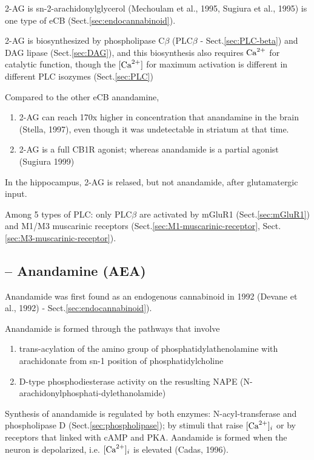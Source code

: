 2-AG is sn-2-arachidonylglycerol (Mechoulam et al., 1995,
Sugiura et al., 1995) is one type of eCB (Sect.\ref{sec:endocannabinoid}).

2-AG is biosynthesized by phospholipase  C$\beta$ (PLC$\beta$ -
Sect.\ref{sec:PLC-beta}) and DAG lipase (Sect.\ref{sec:DAG}), and this
biosynthesis also requires ${\text{Ca}^{2+}}$ for catalytic function, though the $[{\text{Ca}^{2+}}]$ for
maximum activation is different in different PLC isozymes (Sect.\ref{sec:PLC})

Compared to the other eCB anandamine, 
\begin{enumerate}
  \item   2-AG can reach 170x higher in
concentration that anandamine in the brain (Stella, 1997), even though it was
undetectable in striatum at that time.

  \item 2-AG is a full CB1R agonist; whereas anandamide is a partial agonist
  (Sugiura 1999)
\end{enumerate}

In the hippocampus, 2-AG is relased, but not anandamide, after glutamatergic
input.


Among 5 types of PLC: only PLC$\beta$ are activated by mGluR1
(Sect.\ref{sec:mGluR1}) and M1/M3 muscarinic receptors
(Sect.\ref{sec:M1-muscarinic-receptor}, Sect.\ref{sec:M3-muscarinic-receptor}).
 
\subsection{-- Anandamine (AEA)}
\label{sec:anandamine}

Anandamide was first found as an endogenous cannabinoid in 1992 (Devane et al.,
1992) - Sect.\ref{sec:endocannabinoid}). 

Anandamide is formed through the pathways that involve
\begin{enumerate}
  
  \item trans-acylation of the amino group of phosphatidylathenolamine 
  with arachidonate from sn-1 position of phosphatidylcholine
  
  
  \item   D-type phosphodiesterase activity on the resuslting NAPE
  (N-arachidonylphosphati-dylethanolamide)
  
\end{enumerate}
Synthesis of anandamide is regulated by both enzymes:  N-acyl-transferase and
phospholipase D (Sect.\ref{sec:phospholipase}); by stimuli that raise $[{\text{Ca}^{2+}}]_i$
or by receptors that linked with cAMP and PKA. Aandamide is formed when the
neuron is depolarized, i.e. $[{\text{Ca}^{2+}}]_i$ is elevated (Cadas, 1996).


